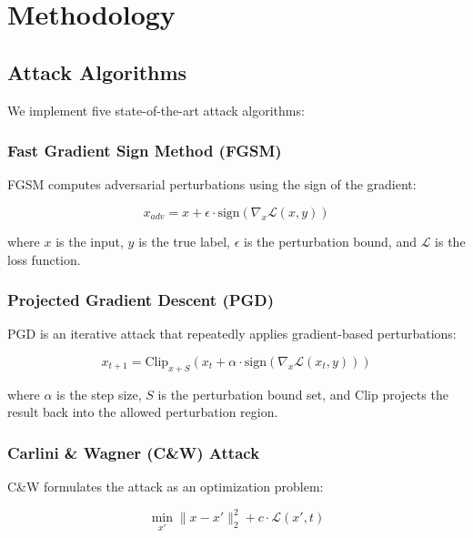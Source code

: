 \documentclass[10pt,conference]{IEEEtran}
\begin{document}
\section{Methodology}
\label{sec:methodology}

\subsection{Attack Algorithms}

We implement five state-of-the-art attack algorithms:

\subsubsection{Fast Gradient Sign Method (FGSM)}

FGSM computes adversarial perturbations using the sign of the gradient:

\begin{equation}
x_{adv} = x + \epsilon \cdot \text{sign}(\nabla_x \mathcal{L}(x, y))
\end{equation}

where $x$ is the input, $y$ is the true label, $\epsilon$ is the perturbation bound, and $\mathcal{L}$ is the loss function.

\subsubsection{Projected Gradient Descent (PGD)}

PGD is an iterative attack that repeatedly applies gradient-based perturbations:

\begin{equation}
x_{t+1} = \text{Clip}_{x+S}(x_t + \alpha \cdot \text{sign}(\nabla_x \mathcal{L}(x_t, y)))
\end{equation}

where $\alpha$ is the step size, $S$ is the perturbation bound set, and $\text{Clip}$ projects the result back into the allowed perturbation region.

\subsubsection{Carlini \& Wagner (C\&W) Attack}

C\&W formulates the attack as an optimization problem:

\begin{equation}
\min_{x'} \|x - x'\|_2^2 + c \cdot \mathcal{L}(x', t)
\end{equation}
\end{document}
